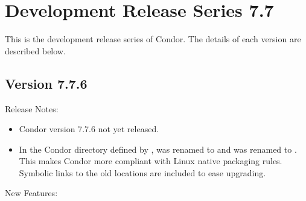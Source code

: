 
\section{\label{sec:History-7-7}Development Release Series 7.7}

This is the development release series of Condor.
The details of each version are described below.

\subsection*{\label{sec:New-7-7-6}Version 7.7.6}

\noindent Release Notes:

\begin{itemize}

\item Condor version 7.7.6 not yet released.

\item In the Condor directory defined by ,
 was
renamed to  and  was
renamed to .
This makes Condor more compliant with Linux native packaging rules.
Symbolic links to the old locations are included to ease upgrading.

\end{itemize}


\noindent New Features:


